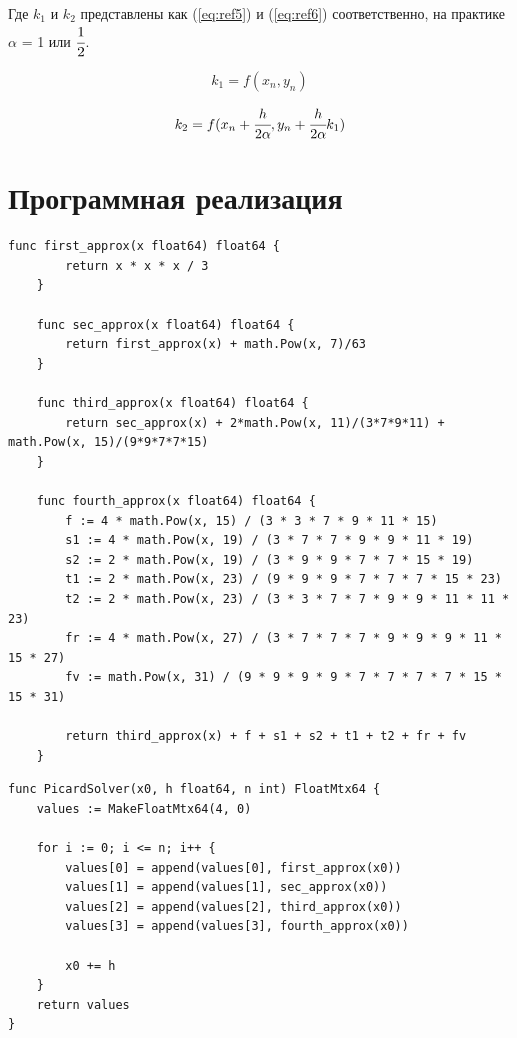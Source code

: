 Где $k_1$ и $k_2$ представлены как (\ref{eq:ref5}) и (\ref{eq:ref6}) соответственно, на практике $\alpha$ = 1 или $\cfrac{1}{2}$.

\begin{equation}
	k_1 = f(x_n, y_n)
	\label{eq:ref5}
\end{equation}

\begin{equation}
	k_2 = f(x_n + \cfrac{h}{2\alpha}, y_n + \cfrac{h}{2\alpha}k_1)
	\label{eq:ref6}
\end{equation}

\chapter{Программная реализация}
\captionsetup{singlelinecheck = false, justification=raggedright}
\begin{lstlisting}[label=lst:pcev,caption=Приближения для метода Пикара]
	func first_approx(x float64) float64 {
		return x * x * x / 3
	}
	
	func sec_approx(x float64) float64 {
		return first_approx(x) + math.Pow(x, 7)/63
	}
	
	func third_approx(x float64) float64 {
		return sec_approx(x) + 2*math.Pow(x, 11)/(3*7*9*11) + math.Pow(x, 15)/(9*9*7*7*15)
	}
	
	func fourth_approx(x float64) float64 {
		f := 4 * math.Pow(x, 15) / (3 * 3 * 7 * 9 * 11 * 15)
		s1 := 4 * math.Pow(x, 19) / (3 * 7 * 7 * 9 * 9 * 11 * 19)
		s2 := 2 * math.Pow(x, 19) / (3 * 9 * 9 * 7 * 7 * 15 * 19)
		t1 := 2 * math.Pow(x, 23) / (9 * 9 * 9 * 7 * 7 * 7 * 15 * 23)
		t2 := 2 * math.Pow(x, 23) / (3 * 3 * 7 * 7 * 9 * 9 * 11 * 11 * 23)
		fr := 4 * math.Pow(x, 27) / (3 * 7 * 7 * 7 * 9 * 9 * 9 * 11 * 15 * 27)
		fv := math.Pow(x, 31) / (9 * 9 * 9 * 9 * 7 * 7 * 7 * 7 * 15 * 15 * 31)
		
		return third_approx(x) + f + s1 + s2 + t1 + t2 + fr + fv
	}
\end{lstlisting}

\begin{lstlisting}[label=lst:pc,caption=Метод Пикара]
func PicardSolver(x0, h float64, n int) FloatMtx64 {
	values := MakeFloatMtx64(4, 0)
	
	for i := 0; i <= n; i++ {
		values[0] = append(values[0], first_approx(x0))
		values[1] = append(values[1], sec_approx(x0))
		values[2] = append(values[2], third_approx(x0))
		values[3] = append(values[3], fourth_approx(x0))
		
		x0 += h
	}
	return values
}
\end{lstlisting}

